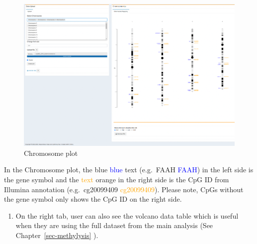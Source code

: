 \documentclass[
  a4paper,
  oneside,
  open=any]{scrreport}
\providecommand{\tightlist}{%
  \setlength{\itemsep}{0pt}\setlength{\parskip}{0pt}}\usepackage{longtable,booktabs,array}
\begin{document}
\begin{figure}[H]

{\centering \includegraphics{./_images/chromosome1.png}

}

\caption{Chromosome plot}

\end{figure}

\begin{tcolorbox}[enhanced jigsaw, bottomrule=.15mm, left=2mm, coltitle=black, breakable, colback=white, arc=.35mm, rightrule=.15mm, opacitybacktitle=0.6, toptitle=1mm, leftrule=.75mm, toprule=.15mm, bottomtitle=1mm, opacityback=0, colbacktitle=quarto-callout-note-color!10!white, titlerule=0mm, colframe=quarto-callout-note-color-frame, title=\textcolor{quarto-callout-note-color}{\faInfo}\hspace{0.5em}{Note}]

In the Chromosome plot, the {blue} \textcolor{blue}{blue} text
(e.g.~{FAAH} \textcolor{blue}{FAAH}) in the left side is the gene symbol
and the \textcolor{orange}{text} {orange} in the right side is the CpG
ID from Illumina annotation (e.g.~{cg20099409}
\textcolor{orange}{cg20099409}). Please note, CpGs without the gene
symbol only shows the CpG ID on the right side.

\end{tcolorbox}

\begin{enumerate}
\def\labelenumi{\arabic{enumi}.}
\setcounter{enumi}{2}
\tightlist
\item
  On the right tab, user can also see the volcano data table which is
  useful when they are using the full dataset from the main analysis
  (See Chapter~\ref{sec-methylysis} ).
\end{enumerate}
\end{document}
